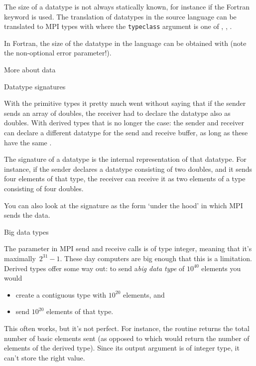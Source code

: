 
The size of a datatype is not always statically known, for instance if
the Fortran  keyword is used. The translation of
datatypes in the source language can be translated to MPI types with
%
%
where the \lstinline{typeclass} argument is one of
,
,
.


In Fortran, the size of the datatype in the language can be obtained with
 (note the non-optional error parameter!).


 {More about data}

 {Datatype signatures}
\label{sec:signature}

With the primitive types it pretty much went
without saying that if the sender sends an array of doubles, the
receiver had to declare the datatype also as doubles. With derived
types that is no longer the case: the sender and receiver can declare
a different datatype for the send and receive buffer, as long as these
have the same .

The signature of a datatype is the internal representation of that
datatype. For instance, if the sender declares a datatype consisting
of two doubles, and it sends four elements of that type, the receiver
can receive it as two elements of a type consisting of four doubles.

You can also look at the signature as the form `under the hood' in which MPI
sends the data.


 {Big data types}

The  parameter in MPI send and receive calls is of type integer,
meaning that it's maximally~$2^{31}-1$. These day computers are big enough
that this is a limitation. Derived types offer some way out: to send
a\emph{big data type} of $10^{40}$ elements you would
\begin{itemize}
\item create a contiguous type with $10^{20}$ elements, and
\item send $10^{20}$ elements of that type.
\end{itemize}
This often works, but it's not perfect. For instance, the routine
 returns the total number of basic elements sent
(as opposed to  which would return the number
of elements of the derived type). Since its output argument is
of integer type, it can't store the right value.


